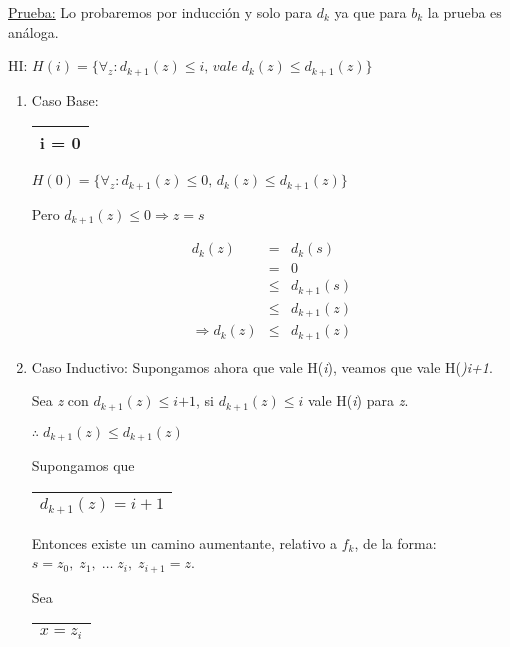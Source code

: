 \documentclass[12pt,a4paper]{report}
\begin{document}
		\underline{Prueba:} Lo probaremos por inducción y solo para $d_{k}$ ya que para $b_{k}$ la prueba es análoga.

		\begin{center}
			HI: $H(i) = \lbrace\forall_{z}: d_{k+1}(z) \leq \textit{i}, \, vale \; d_{k}(z) \leq d_{k+1}(z)  \rbrace$
		\end{center}

		\begin{enumerate}
			\item Caso Base: \begin{tabular}{|c|} \hline i = 0 \\ \hline \end{tabular} \qquad	$H(0) = \lbrace\forall_{z}: d_{k+1}(z) \leq 0, \, d_{k}(z) \leq d_{k+1}(z)  \rbrace$

			Pero $d_{k+1}(z) \leq 0 \Rightarrow z = \textit{s}$

			\begin{eqnarray}
				\nonumber d_{k}(z) & = & d_{k}(\textit{s}) \\
				\nonumber & = & 0 \\
				\nonumber & \leq & d_{k+1}(\textit{s}) \\
				\nonumber & \leq & d_{k+1}(z) \\
				\nonumber \Rightarrow d_{k}(z) & \leq & d_{k+1}(z)
			\end{eqnarray}

			\item Caso Inductivo: Supongamos ahora que vale H(\textit{i}), veamos que vale H(\textit{)i+1}.

			Sea \textit{z} con $d_{k+1}(z) \leq \textit{i+1}$, si $d_{k+1}(z) \leq \textit{i}$ vale H(\textit{i}) para \textit{z}.

			\begin{center} $\therefore \; d_{k+1}(z) \leq d_{k+1}(z) $ \end{center}

			Supongamos que \begin{tabular}{|c|} \hline $d_{k+1}(z) = i+1$ \\ \hline \end{tabular}

			Entonces existe un camino aumentante, relativo a $f_{k}$, de la forma: $s = z_{0}, \; z_{1}, \; \dotsc \; z_{i}, \; z_{i+1} = z$.

			Sea \begin{tabular}{|c|} \hline $x = z_{i}$ \\ \hline \end{tabular}


\end{enumerate}
\end{document}

